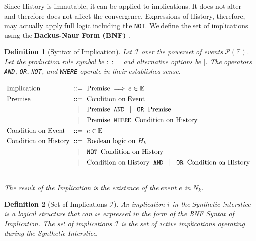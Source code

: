 \documentclass[11pt, a4paper]{article}
\theoremstyle{formalism}
\newtheorem{formalism}{Definition}
\begin{document}
{Since History is immutable, it can be applied to implications. It does not
alter and therefore does not affect the convergence. Expressions of History,
therefore, may actually apply full logic including the {\tt NOT}. We define the
set of implications using the \textbf{Backus-Naur Form
(BNF)}~\cite{Backus1959}.

\begin{formalism}[Syntax of Implication]
Let $\mathcal{I}$ over the powerset of events $\mathcal{P}(\mathbb{E})$.
Let the production rule symbol be $::=$ and alternative options be $|$. The operators
{\tt AND}, {\tt OR}, {\tt NOT}, and {\tt WHERE} operate in their established sense.

\begin{displaymath}
\renewcommand{\arraystretch}{1.3} %
\setlength{\arraycolsep}{3pt}     %
\begin{array}{l c l}              %
    \text{Implication} & ::= & \text{Premise} \implies e \in \mathbb{E} \\
    \text{Premise}     & ::= & \text{Condition on Event} \\
                       & \mid & \text{Premise} \textnormal{\texttt{ AND }} \mid \textnormal{\texttt{ OR }} \text{Premise} \\
                       & \mid & \text{Premise} \textnormal{\texttt{ WHERE }} \text{Condition on History} \\
    \text{Condition on Event}   & ::= & e \in \mathbb{E} \\
    \text{Condition on History} & ::= & \text{Boolean logic on } H_k \\
                                & \mid & \textnormal{\texttt{NOT }} \text{Condition on History} \\
                                & \mid & \text{Condition on History} \textnormal{\texttt{ AND }} \mid \textnormal{\texttt{ OR }} \text{Condition on History} \\
    & & 
\end{array}
\end{displaymath}
    The result of the {\it Implication\/} is the existence of the event $e$ in $N_k$.
\end{formalism}

\begin{formalism}[Set of Implications $\mathcal{I}$]
    An implication $i$ in the Synthetic Interstice is a logical structure that can 
    be expressed in the form of the BNF Syntax of Implication. The set of 
    implications $\mathcal{I}$ is the set of active implications operating during 
    the Synthetic Interstice.
\end{formalism}


}
\end{document}
